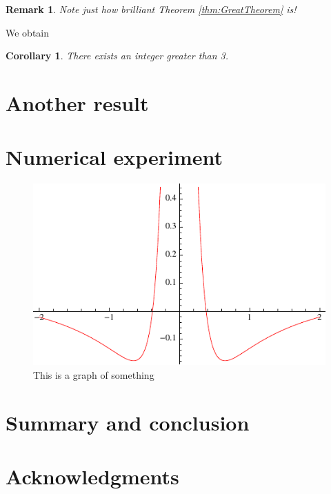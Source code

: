 \documentclass[12pt]{article}
\newtheorem{remark}{Remark}[section]
\newtheorem{cor}{Corollary}[section]
\numberwithin{equation}{section}
\begin{document}
\begin{remark} 
Note just how brilliant Theorem \ref{thm:GreatTheorem} is!
\end{remark}

We obtain
\begin{cor}
There exists an integer greater than 3.
\end{cor}

\section{Another result}


\section{Numerical experiment}

\begin{figure}[htb!]
\begin{center}
\includegraphics{SVIarb}
\caption{This is a graph of something}
\label{fig:someGraph}
\end{center}
\end{figure}



\section{Summary and conclusion}







\section*{Acknowledgments}
\end{document}
